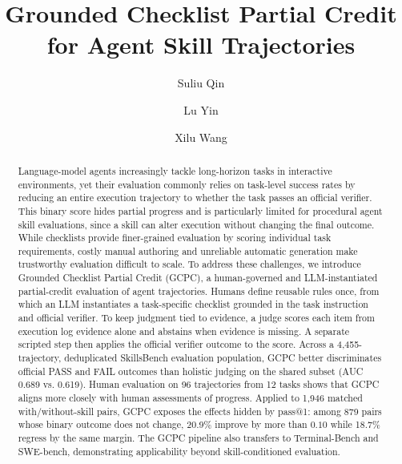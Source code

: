 \documentclass[sigconf,nonacm]{acmart}
\begin{document}
\title{Grounded Checklist Partial Credit for Agent Skill Trajectories}


\author{Suliu Qin}

\author{Lu Yin}

\author{Xilu Wang}

\begin{abstract}
Language-model agents increasingly tackle long-horizon tasks in interactive environments, yet their evaluation commonly relies on task-level success rates by reducing an entire execution trajectory to whether the task passes an official verifier. This binary score hides partial progress and is particularly limited for procedural agent skill evaluations, since a skill can alter execution without changing the final outcome. While checklists provide finer-grained evaluation by scoring individual task requirements, costly manual authoring and unreliable automatic generation make trustworthy evaluation difficult to scale. To address these challenges, we introduce Grounded Checklist Partial Credit (GCPC), a human-governed and LLM-instantiated partial-credit evaluation of agent trajectories. Humans define reusable rules once, from which an LLM instantiates a task-specific checklist grounded in the task instruction and official verifier. To keep judgment tied to evidence, a judge scores each item from execution log evidence alone and abstains when evidence is missing. A separate scripted step then applies the official verifier outcome to the score. Across a 4{,}455-trajectory, deduplicated SkillsBench evaluation population, GCPC better discriminates official PASS and FAIL outcomes than holistic judging on the shared subset (AUC 0.689 vs. 0.619). Human evaluation on 96 trajectories from 12 tasks shows that GCPC aligns more closely with human assessments of progress. Applied to 1{,}946 matched with/without-skill pairs,
GCPC exposes the effects hidden by pass@1: among 879 pairs whose binary outcome
does not change, 20.9\% improve by more than $0.10$ while 18.7\% regress by the
same margin. The GCPC pipeline also transfers to Terminal-Bench and SWE-bench, demonstrating applicability beyond skill-conditioned evaluation.
\end{abstract}
\end{document}

